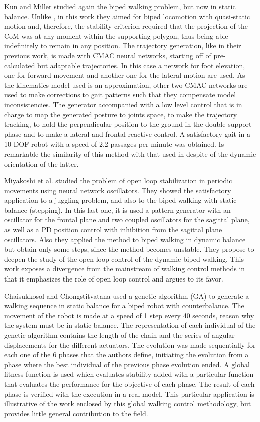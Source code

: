 Kun and Miller \cite{Kun97Adaptive} studied again the biped walking
problem, but now in static balance. Unlike \cite{Kun96Adaptive}, in
this work they aimed for biped locomotion with quasi-static motion
and, therefore, the stability criterion required that the projection
of the CoM was at any moment within the supporting polygon, thus being
able indefinitely to remain in any position. The trajectory
generation, like in their previous work, is made with CMAC neural
networks, starting off of pre-calculated but adaptable
trajectories. In this case a network for foot elevation, one for
forward movement and another one for the lateral motion are used. As
the kinematics model used is an approximation, other two CMAC networks
are used to make corrections to gait patterns such that they
compensate model inconsistencies. The generator accompanied with a low
level control that is in charge to map the generated posture to joints
space, to make the trajectory tracking, to hold the perpendicular
position to the ground in the double support phase and to make a
lateral and frontal reactive control. A satisfactory gait in a 10-DOF
robot with a speed of 2,2 passages per minute was obtained. Is
remarkable the similarity of this method with that used in
\cite{Kun96Adaptive} despite of the dynamic orientation of the latter.


Miyakoshi et al. \cite{Miyakoshi00Stabilization} studied the problem
of open loop stabilization in periodic movements using neural network
oscillators. They showed the satisfactory application to a juggling
problem, and also to the biped walking with static balance
(stepping). In this last one, it is used a pattern generator with an
oscillator for the frontal plane and two coupled oscillators for the
sagittal plane, as well as a PD position control with inhibition from
the sagittal plane oscillators. Also they applied the method to biped
walking in dynamic balance but obtain only some steps, since the
method becomes unstable. They propose to deepen the study of the open
loop control of the dynamic biped walking. This work exposes a
divergence from the mainstream of walking control methods in that it
emphasizes the role of open loop control and argues to its favor.


Chaisukkosol and Chongstitvatana \cite{Chaisukkosol01Automatic} used a
genetic algorithm (GA) to generate a walking sequence in static
balance for a biped robot with counterbalance. The movement of the
robot is made at a speed of 1 step every 40 seconds, reason why the
system must be in static balance. The representation of each
individual of the genetic algorithm contains the length of the chain
and the series of angular displacements for the different
actuators. The evolution was made sequentially for each one of the 6
phases that the authors define, initiating the evolution from a phase
where the best individual of the previous phase evolution ended. A
global fitness function is used which evaluates stability added with a
particular function that evaluates the performance for the objective
of each phase. The result of each phase is verified with the execution
in a real model. This particular application is illustrative of the
work enclosed by this global walking control methodology, but provides
little general contribution to the field.



